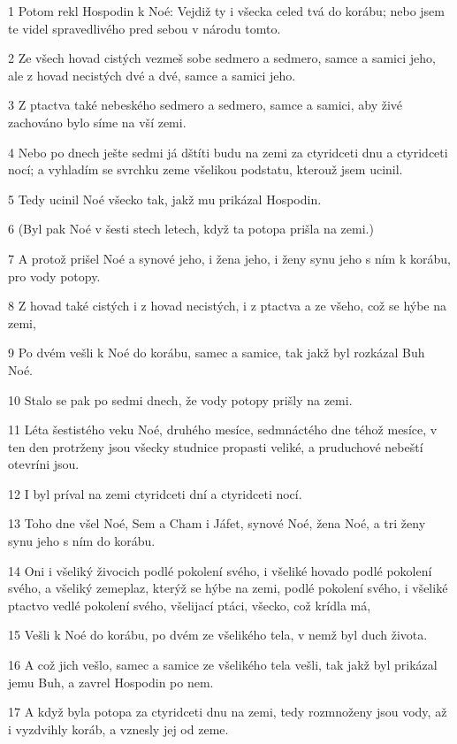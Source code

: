 \par 1 Potom rekl Hospodin k Noé: Vejdiž ty i všecka celed tvá do korábu; nebo jsem te videl spravedlivého pred sebou v národu tomto.
\par 2 Ze všech hovad cistých vezmeš sobe sedmero a sedmero, samce a samici jeho, ale z hovad necistých dvé a dvé, samce a samici jeho.
\par 3 Z ptactva také nebeského sedmero a sedmero, samce a samici, aby živé zachováno bylo síme na vší zemi.
\par 4 Nebo po dnech ješte sedmi já dštíti budu na zemi za ctyridceti dnu a ctyridceti nocí; a vyhladím se svrchku zeme všelikou podstatu, kterouž jsem ucinil.
\par 5 Tedy ucinil Noé všecko tak, jakž mu prikázal Hospodin.
\par 6 (Byl pak Noé v šesti stech letech, když ta potopa prišla na zemi.)
\par 7 A protož prišel Noé a synové jeho, i žena jeho, i ženy synu jeho s ním k korábu, pro vody potopy.
\par 8 Z hovad také cistých i z hovad necistých, i z ptactva a ze všeho, což se hýbe na zemi,
\par 9 Po dvém vešli k Noé do korábu, samec a samice, tak jakž byl rozkázal Buh Noé.
\par 10 Stalo se pak po sedmi dnech, že vody potopy prišly na zemi.
\par 11 Léta šestistého veku Noé, druhého mesíce, sedmnáctého dne téhož mesíce, v ten den protrženy jsou všecky studnice propasti veliké, a pruduchové nebeští otevríni jsou.
\par 12 I byl príval na zemi ctyridceti dní a ctyridceti nocí.
\par 13 Toho dne všel Noé, Sem a Cham i Jáfet, synové Noé, žena Noé, a tri ženy synu jeho s ním do korábu.
\par 14 Oni i všeliký živocich podlé pokolení svého, i všeliké hovado podlé pokolení svého, a všeliký zemeplaz, kterýž se hýbe na zemi, podlé pokolení svého, i všeliké ptactvo vedlé pokolení svého, všelijací ptáci, všecko, což krídla má,
\par 15 Vešli k Noé do korábu, po dvém ze všelikého tela, v nemž byl duch života.
\par 16 A což jich vešlo, samec a samice ze všelikého tela vešli, tak jakž byl prikázal jemu Buh, a zavrel Hospodin po nem.
\par 17 A když byla potopa za ctyridceti dnu na zemi, tedy rozmnoženy jsou vody, až i vyzdvihly koráb, a vznesly jej od zeme.
